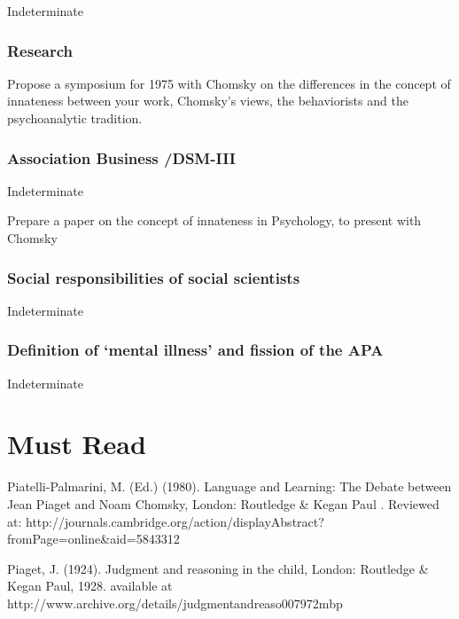 \begin{refsection}
Indeterminate

\subsubsection{Research}
\label{research}

Propose a symposium for 1975 with Chomsky on the differences in the concept of innateness between your work, Chomsky’s views, the behaviorists and the psychoanalytic tradition.

\subsubsection{Association Business \slash  DSM-III}
\label{associationbusinessdsm-iii}

Indeterminate\begin{writingtask}[Piaget]\label{writingtask:piaget}
Prepare a paper on the concept of innateness in Psychology, to present with Chomsky
\end{writingtask}

\subsubsection{Social responsibilities of social scientists}
\label{socialresponsibilitiesofsocialscientists}

Indeterminate

\subsubsection{Definition of ‘mental illness’ and fission of the APA}
\label{definitionof‘mentalillness’andfissionoftheapa}

Indeterminate

\section{Must Read}
\label{mustread}

Piatelli-Palmarini, M. (Ed.) (1980). Language and Learning: The Debate between Jean Piaget and Noam Chomsky, London: Routledge \& Kegan Paul . Reviewed at: http:\slash \slash journals.cambridge.org\slash action\slash displayAbstract?fromPage=online\&aid=5843312

Piaget, J. (1924). Judgment and reasoning in the child, London: Routledge \& Kegan Paul, 1928. available at http:\slash \slash www.archive.org\slash details\slash judgmentandreaso007972mbp


\end{refsection}
